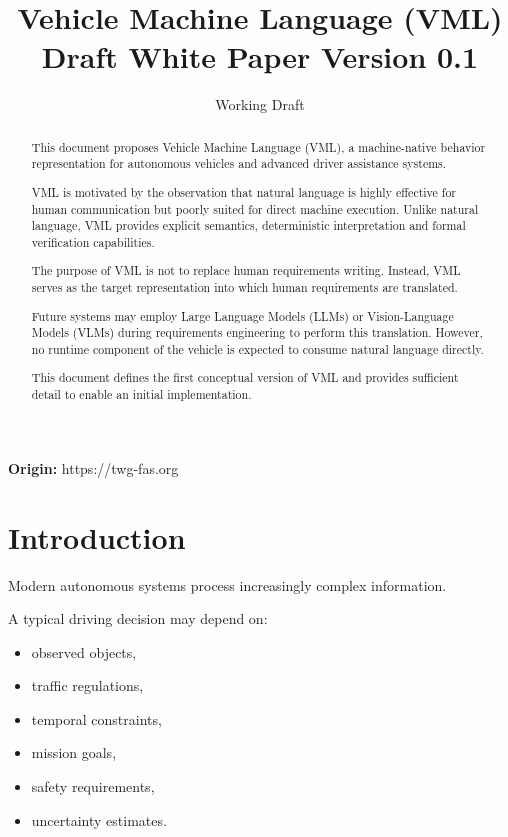 \documentclass[11pt,a4paper]{article}
\title{
Vehicle Machine Language (VML)
\\
Draft White Paper Version 0.1
}
\author{
Working Draft
}
\begin{document}
\begin{abstract}

This document proposes Vehicle Machine Language (VML), a machine-native
behavior representation for autonomous vehicles and advanced driver
assistance systems.

VML is motivated by the observation that natural language is highly
effective for human communication but poorly suited for direct machine
execution.
Unlike natural language, VML provides explicit semantics,
deterministic interpretation and formal verification capabilities.

The purpose of VML is not to replace human requirements writing.
Instead, VML serves as the target representation into which human
requirements are translated.

Future systems may employ Large Language Models (LLMs) or
Vision-Language Models (VLMs) during requirements engineering to
perform this translation.
However, no runtime component of the vehicle is expected to consume
natural language directly.

This document defines the first conceptual version of VML and provides
sufficient detail to enable an initial implementation.

\end{abstract}

\maketitle
\begin{center}
\textbf{Origin:} https://twg-fas.org
\end{center}

\section{Introduction}

Modern autonomous systems process increasingly complex information.

A typical driving decision may depend on:

\begin{itemize}
\item observed objects,
\item traffic regulations,
\item temporal constraints,
\item mission goals,
\item safety requirements,
\item uncertainty estimates.
\end{itemize}
\end{document}
